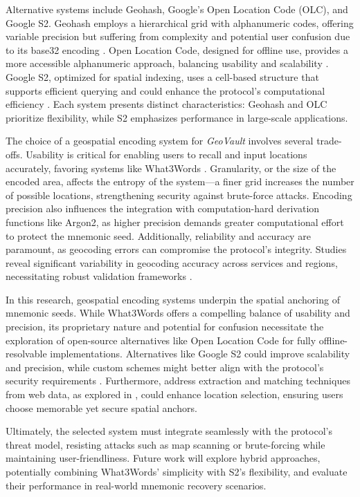 \documentclass[journal,article,accept,pdftex,moreauthors]{Definitions/mdpi}
\begin{document}
Alternative systems include Geohash, Google's Open Location Code (OLC), and Google S2. Geohash employs a hierarchical grid with alphanumeric codes, offering variable precision but suffering from complexity and potential user confusion due to its base32 encoding \cite{Mai2022}. Open Location Code, designed for offline use, provides a more accessible alphanumeric approach, balancing usability and scalability \cite{Mai2022}. Google S2, optimized for spatial indexing, uses a cell-based structure that supports efficient querying and could enhance the protocol's computational efficiency \cite{Mai2022}. Each system presents distinct characteristics: Geohash and OLC prioritize flexibility, while S2 emphasizes performance in large-scale applications.

The choice of a geospatial encoding system for \textit{GeoVault} involves several trade-offs. Usability is critical for enabling users to recall and input locations accurately, favoring systems like What3Words \cite{Jiang2018a}. Granularity, or the size of the encoded area, affects the entropy of the system---a finer grid increases the number of possible locations, strengthening security against brute-force attacks. Encoding precision also influences the integration with computation-hard derivation functions like Argon2, as higher precision demands greater computational effort to protect the mnemonic seed. Additionally, reliability and accuracy are paramount, as geocoding errors can compromise the protocol's integrity. Studies reveal significant variability in geocoding accuracy across services and regions, necessitating robust validation frameworks \cite{Goldberg2013, Zandbergen2008a}.

In this research, geospatial encoding systems underpin the spatial anchoring of mnemonic seeds. While What3Words offers a compelling balance of usability and precision, its proprietary nature and potential for confusion \cite{Arthur2023} necessitate the exploration of open-source alternatives like Open Location Code for fully offline-resolvable implementations. Alternatives like Google S2 could improve scalability and precision, while custom schemes might better align with the protocol's security requirements \cite{Mai2022}. Furthermore, address extraction and matching techniques from web data, as explored in \cite{Efremova2018}, could enhance location selection, ensuring users choose memorable yet secure spatial anchors.

Ultimately, the selected system must integrate seamlessly with the protocol's threat model, resisting attacks such as map scanning or brute-forcing while maintaining user-friendliness. Future work will explore hybrid approaches, potentially combining What3Words' simplicity with S2's flexibility, and evaluate their performance in real-world mnemonic recovery scenarios.
\end{document}
